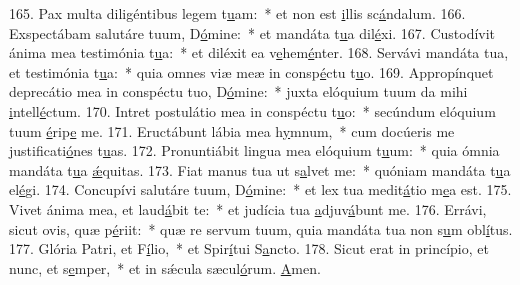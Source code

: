 165. Pax multa diligéntibus legem t\uline{u}am:~* et non est \uline{i}llis sc\uline{á}ndalum.
166. Exspectábam salutáre tuum, D\uline{ó}mine:~* et mandáta t\uline{u}a dil\uline{é}xi.
167. Custodívit ánima mea testimónia t\uline{u}a:~* et diléxit ea v\uline{e}hem\uline{é}nter.
168. Servávi mandáta tua, et testimónia t\uline{u}a:~* quia omnes viæ meæ in consp\uline{é}ctu t\uline{u}o.
169. Appropínquet deprecátio mea in conspéctu tuo, D\uline{ó}mine:~* juxta elóquium tuum da mihi \uline{i}ntell\uline{é}ctum.
170. Intret postulátio mea in conspéctu t\uline{u}o:~* secúndum elóquium tuum \uline{é}rip\uline{e} me.
171. Eructábunt lábia mea h\uline{y}mnum,~* cum docúeris me justificati\uline{ó}nes t\uline{u}as.
172. Pronuntiábit lingua mea elóquium t\uline{u}um:~* quia ómnia mandáta t\uline{u}a \uline{ǽ}quitas.
173. Fiat manus tua ut s\uline{a}lvet me:~* quóniam mandáta t\uline{u}a el\uline{é}gi.
174. Concupívi salutáre tuum, D\uline{ó}mine:~* et lex tua medit\uline{á}tio m\uline{e}a est.
175. Vivet ánima mea, et laud\uline{á}bit te:~* et judícia tua \uline{a}djuv\uline{á}bunt me.
176. Errávi, sicut ovis, quæ p\uline{é}riit:~* quæ re servum tuum, quia mandáta tua non s\uline{u}m obl\uline{í}tus.
177. Glória Patri, et F\uline{í}lio,~* et Spir\uline{í}tui S\uline{a}ncto.
178. Sicut erat in princípio, et nunc, et s\uline{e}mper,~* et in sǽcula sæcul\uline{ó}rum. \uline{A}men.
